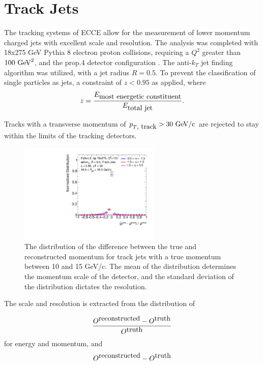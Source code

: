 \section {Track Jets}
\label{section2}

The tracking systems of ECCE allow for the measurement of lower momentum charged jets with excellent scale and resolution.  The analysis was completed with 18x275 GeV Pythia 8 electron proton collisions, requiring a $Q^2$ greater than $100 \hbox{ GeV}^2$, and the prop.4 detector configuration \cite{Prop.4:Config}.  The anti-$k_T$ jet finding algorithm was utilized, with a jet radius $R=0.5$.  To prevent the classification of single particles as jets, a constraint of $z<0.95$ as applied, where 
\begin{equation}
z=\frac{E_{\hbox{most energetic constituent}}}{E_{\hbox{total jet}}}.
\label{eq:jet_z}
\end{equation}

Tracks with a transverse momentum of $p_{T\hbox{, track}} > 30\hbox{ GeV/c}$ are rejected to stay within the limits of the tracking detectors.

\begin{figure}[h]
    \centering
    \includegraphics[width=0.6\textwidth]{figs/Final_Plots/JES_Slice_Plot_EtaBins2_grouped.pdf}
    \caption{The distribution of the difference between the true and reconstructed momentum for track jets with a true momentum between 10 and 15 GeV/c.  The mean of the distribution determines the momentum scale of the detector, and the standard deviation of the distribution dictates the resolution.}
    \label{fig:track_momentum_slice}
\end{figure}

The scale and resolution is extracted from the distribution of 

\begin{equation}
    \frac{O^{\hbox{reconstructed}}-O^{\hbox{truth}}}{O^{\hbox{truth}}}
    \label{eq:distribution}
\end{equation}
for energy and momentum, and 
\begin{equation}
    O^{\hbox{reconstructed}}-O^{\hbox{truth}}
    \label{eq:distribution}
\end{equation}

